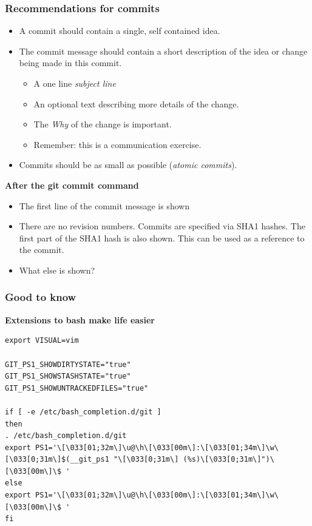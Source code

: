 \documentclass[handout,notes]{gittalk}
\begin{document}
\begin{frame}
\frametitle{Recommendations for commits}
\begin{itemize}
  \item A commit should contain a single, self contained idea.
  \item The commit message should contain a short description of the
    idea or change being made in this commit.
    \begin{itemize}
	  \item A one line \emph{subject line}
	  \item An optional text describing more details of the change.
	  \item The \emph{Why} of the change is important.
	  \item Remember: this is a communication exercise.
    \end{itemize}
  \item Commits should be as small as possible (\emph{atomic
    commits}).
\end{itemize}
\pause
\vspace*{0.5em}
\textbf{After the git commit command}
\begin{itemize}
  \item The first line of the commit message is shown
  \item There are no revision numbers. Commits are
        specified via SHA1 hashes. The first part of the SHA1 hash is also
        shown. This can be used as a reference to the commit.
  \item What else is shown?
\end{itemize}
\end{frame}

\begin{frame}[fragile]
\frametitle{Good to know}
\textbf{Extensions to bash make life easier}
\vspace*{0.5em}
\begin{lstlisting}[basicstyle=\tiny\ttfamily]
export VISUAL=vim

GIT_PS1_SHOWDIRTYSTATE="true"
GIT_PS1_SHOWSTASHSTATE="true"
GIT_PS1_SHOWUNTRACKEDFILES="true"

if [ -e /etc/bash_completion.d/git ]
then
. /etc/bash_completion.d/git
export PS1='\[\033[01;32m\]\u@\h\[\033[00m\]:\[\033[01;34m\]\w\[\033[0;31m\]$(__git_ps1 "\[\033[0;31m\] (%s)\[\033[0;31m\]")\[\033[00m\]\$ '
else
export PS1='\[\033[01;32m\]\u@\h\[\033[00m\]:\[\033[01;34m\]\w\[\033[00m\]\$ '
fi
\end{lstlisting}
\end{frame}
\end{document}
